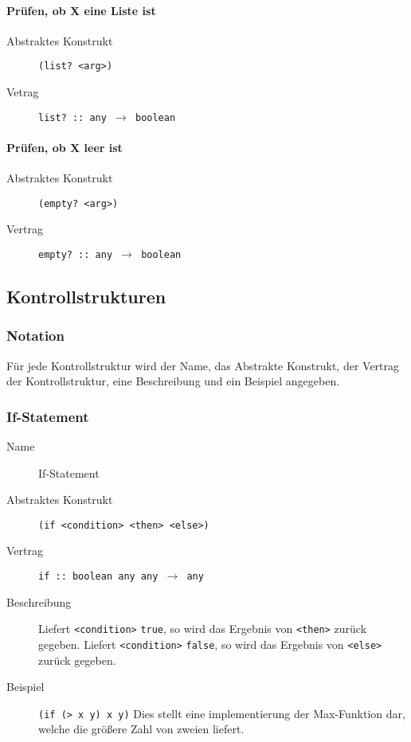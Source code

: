 				\paragraph{Prüfen, ob X eine Liste ist}
					\begin{description}
						\item[Abstraktes Konstrukt] \texttt{(list? <arg>)}
						\item[Vetrag] \texttt{list? :: any $ \rightarrow $ boolean}
					\end{description}

				\paragraph{Prüfen, ob X leer ist}
					\begin{description}
						\item[Abstraktes Konstrukt] \texttt{(empty? <arg>)}
						\item[Vertrag] \texttt{empty? :: any $ \rightarrow $ boolean}
					\end{description}



		\subsection{Kontrollstrukturen}
			\subsubsection{Notation}
				Für jede Kontrollstruktur wird der Name, das Abstrakte Konstrukt, der Vertrag der Kontrollstruktur, eine Beschreibung und ein Beispiel angegeben.


			\subsubsection{If-Statement}
				\label{racket:if}
				\begin{description}
					\item[Name] If-Statement
					\item[Abstraktes Konstrukt] \texttt{(if <condition> <then> <else>)}
					\item[Vertrag] \texttt{if :: boolean any any $ \rightarrow $ any}
					\item[Beschreibung] Liefert \texttt{<condition>} \texttt{true}, so wird das Ergebnis von \texttt{<then>} zurück gegeben. Liefert \texttt{<condition>} \texttt{false}, so wird das Ergebnis von \texttt{<else>} zurück gegeben.
					\item[Beispiel] \texttt{(if (> x y) x y)} Dies stellt eine implementierung der Max-Funktion dar, welche die größere Zahl von zweien liefert.
				\end{description}


